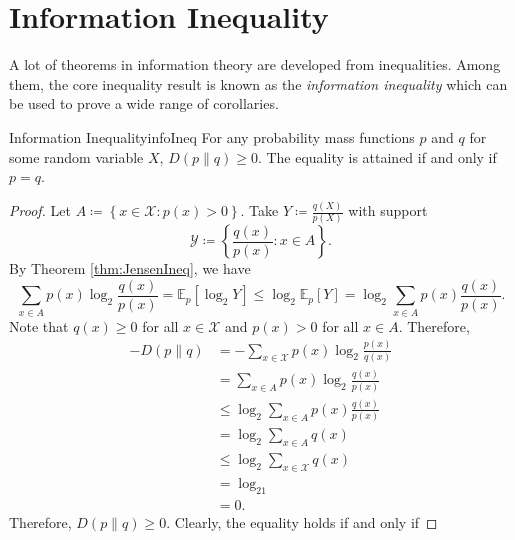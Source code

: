 \documentclass[math]{amznotes}
\theoremstyle{remark}
\begin{document}
\section{Information Inequality}
A lot of theorems in information theory are developed from inequalities. Among them, the core inequality result is known as the \textit{information inequality} which can be used to prove a wide range of corollaries.
\begin{thmbox}{Information Inequality}{infoIneq}
    For any probability mass functions $p$ and $q$ for some random variable $X$, $D\left(p \parallel q\right) \geq 0$. The equality is attained if and only if $p = q$.
    \tcblower
    \begin{proof}
        Let $A \coloneqq \left\{x \in \mathcal{X} \colon p\left(x\right) > 0\right\}$. Take $Y \coloneqq \frac{q\left(X\right)}{p\left(X\right)}$ with support 
        \begin{equation*}
            \mathcal{Y} \coloneqq \left\{\frac{q\left(x\right)}{p\left(x\right)} \colon x \in A\right\}.
        \end{equation*}
        By Theorem \ref{thm:JensenIneq}, we have 
        \begin{equation*}
            \sum_{x \in A}p\left(x\right)\log_2\frac{q\left(x\right)}{p\left(x\right)} = \mathbb{E}_p\left[\log_2Y\right] \leq \log_2\mathbb{E}_p\left[Y\right] = \log_2\sum_{x \in A}p\left(x\right)\frac{q\left(x\right)}{p\left(x\right)}.
        \end{equation*}
        Note that $q\left(x\right) \geq 0$ for all $x \in \mathcal{X}$ and $p\left(x\right) > 0$ for all $x \in A$. Therefore, 
        \begin{align*}
            -D\left(p \parallel q\right) & = -\sum_{x \in \mathcal{X}}p\left(x\right)\log_2\frac{p\left(x\right)}{q\left(x\right)} \\
            & = \sum_{x \in A}p\left(x\right)\log_2\frac{q\left(x\right)}{p\left(x\right)} \\
            & \leq \log_2\sum_{x \in A}p\left(x\right)\frac{q\left(x\right)}{p\left(x\right)} \\
            & = \log_2\sum_{x \in A}q\left(x\right) \\
            & \leq \log_2\sum_{x \in \mathcal{X}}q\left(x\right) \\
            & = \log_21 \\
            & = 0.
        \end{align*}
        Therefore, $D\left(p \parallel q\right) \geq 0$. Clearly, the equality holds if and only if 

\end{proof}
\end{thmbox}
\end{document}
